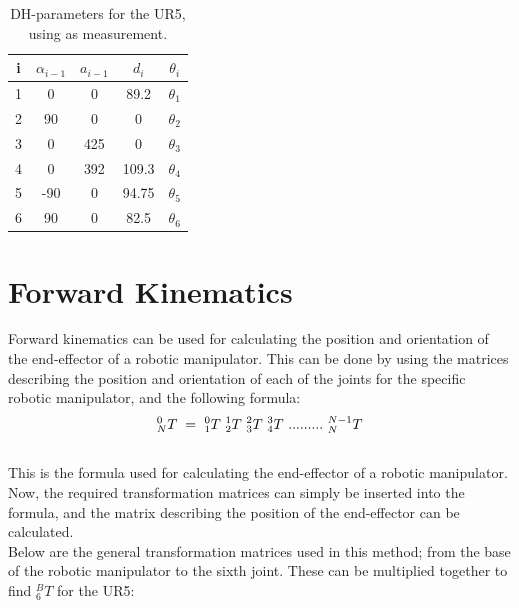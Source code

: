 \begin{table}[h!]
\centering
\begin{tabular}{||c c c c c||} 
 \hline
 i & $\alpha_{i-1}$ & $a_{i-1}$ & $d_{i}$ & $\theta_{i}$ \\ [0.5ex] 
 \hline 
 \hline
 1 & 0 & 0 & 89.2 & $\theta_{1}$ \\ 
 2 & 90 & 0 & 0 & $\theta_{2}$ \\
 3 & 0 & 425 & 0 & $\theta_{3}$ \\
 4 & 0 & 392 & 109.3 & $\theta_{4}$ \\
 5 & -90 & 0 & 94.75 & $\theta_{5}$ \\ 
 6 & 90 & 0 & 82.5 & $\theta_{6}$ \\[1ex] 
 \hline
\end{tabular}
\caption{DH-parameters for the UR5, using \cite{DHPar} as measurement.}
\label{table:1}
\end{table}

\section{Forward Kinematics}
Forward kinematics can be used for calculating the position and orientation of the end-effector of a robotic manipulator. This can be done by using the matrices describing the position and orientation of each of the joints for the specific robotic manipulator, and the following formula: \\

\begin{equation}
    _N^0 T\; =\ _1^0T\  _2^1T\  _3^2T\  _4^3T\  .........\  _N^{N-1}T\\
\end{equation} \\

This is the formula used for calculating the end-effector of a robotic manipulator. \\

Now, the required transformation matrices can simply be inserted into the formula, and the matrix describing the position of the end-effector can be calculated. \\

Below are the general transformation matrices used in this method; from the base of the robotic manipulator to the sixth joint. These can be multiplied together to find \(_6^BT\) for the UR5: 

 \\\


